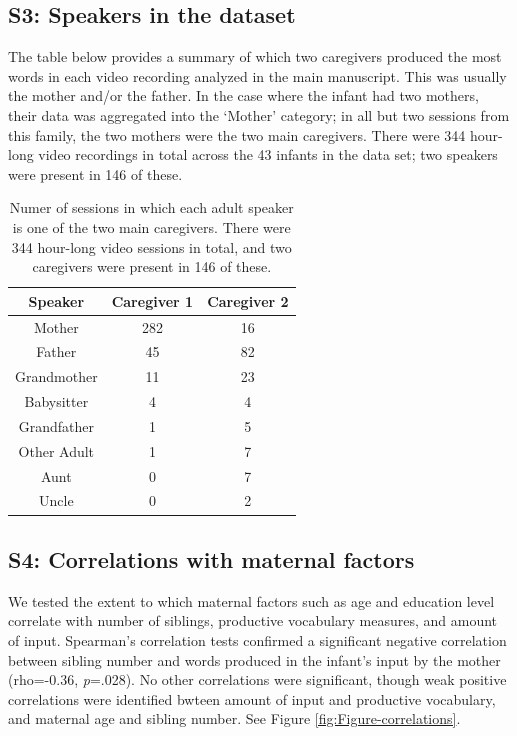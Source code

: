\documentclass[
  man,mask,floatsintext]{apa6}
\begin{document}
\newpage

\hypertarget{s3-speakers-in-the-dataset}{%
\subsection{S3: Speakers in the dataset}\label{s3-speakers-in-the-dataset}}

The table below provides a summary of which two caregivers produced the most words in each video recording analyzed in the main manuscript. This was usually the mother and/or the father. In the case where the infant had two mothers, their data was aggregated into the `Mother' category; in all but two sessions from this family, the two mothers were the two main caregivers. There were 344 hour-long video recordings in total across the 43 infants in the data set; two speakers were present in 146 of these.

\begin{longtable}[t]{ccc}
\caption{\label{tab:table-speakers-sessions}Numer of sessions in which each adult speaker is one of the two main caregivers. There were 344 hour-long video sessions in total, and two caregivers were present in 146 of these.}\\
\toprule
Speaker & Caregiver 1 & Caregiver 2\\
\midrule
Mother & 282 & 16\\
Father & 45 & 82\\
Grandmother & 11 & 23\\
Babysitter & 4 & 4\\
Grandfather & 1 & 5\\
\addlinespace
Other Adult & 1 & 7\\
Aunt & 0 & 7\\
Uncle & 0 & 2\\
\bottomrule
\end{longtable}

\newpage

\hypertarget{s4-correlations-with-maternal-factors}{%
\subsection{S4: Correlations with maternal factors}\label{s4-correlations-with-maternal-factors}}

We tested the extent to which maternal factors such as age and education level correlate with number of siblings, productive vocabulary measures, and amount of input. Spearman's correlation tests confirmed a significant negative correlation between sibling number and words produced in the infant's input by the mother (rho=-0.36, \emph{p}=.028). No other correlations were significant, though weak positive correlations were identified bwteen amount of input and productive vocabulary, and maternal age and sibling number. See Figure \ref{fig:Figure-correlations}.
\end{document}
